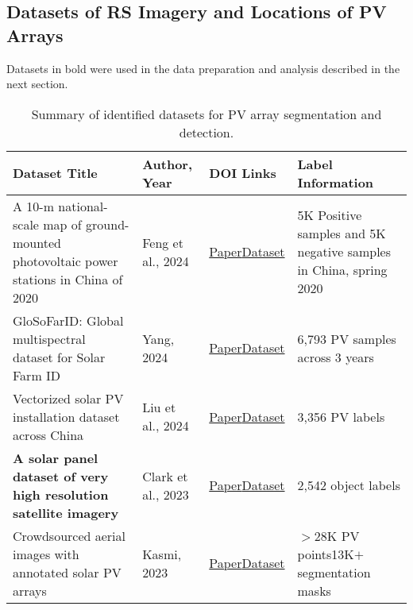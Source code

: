 \subsection{Datasets of RS Imagery and Locations of PV Arrays}
    Datasets in bold were used in the data preparation and analysis described in the next section. 
    \begin{table*}[htbp]
        \centering
        \scriptsize
        \caption{Summary of identified datasets for PV array segmentation and detection.}
        \begin{tabularx}{.95\textwidth}{|p{}|p{}|p{}|p{}|}  \hline
            \textbf{Dataset Title} & \textbf{Author, Year} & \textbf{DOI Links} & \textbf{Label Information} \\
                \hline
                A 10-m national-scale map of ground-mounted photovoltaic power stations in China of 2020 & Feng et al., 2024 & \href{https://doi.org/10.1038/s41597-024-02994-x}{Paper}\linebreak \href{https://doi.org/10.57760/sciencedb.o00121.00001}{Dataset} & 5K Positive samples and 5K negative samples in China, spring 2020 \\
                \hline
                GloSoFarID: Global multispectral dataset for Solar Farm ID & Yang, 2024 & \href{https://doi.org/10.48550/arXiv.2404.05180}{Paper}\linebreak \href{https://github.com/yzyly1992/GloSoFarID/tree/main/data_coordinates}{Dataset} & 6,793 PV samples across 3 years \\
                \hline
                Vectorized solar PV installation dataset across China & Liu et al., 2024 & \href{https://doi.org/10.1038/s41597-024-04356-z}{Paper}\linebreak \href{https://github.com/qingfengxitu/ChinaPV}{Dataset} & 3,356 PV labels \\
                \hline
                \textbf{A solar panel dataset of very high resolution satellite imagery} & Clark et al., 2023 & \href{https://doi.org/10.1038/s41597-023-02539-8}{Paper}\linebreak \href{https://doi.org/10.6084/m9.figshare.22081091.v3}{Dataset} & 2,542 object labels \\
                \hline
                Crowdsourced aerial images with annotated solar PV arrays & Kasmi, 2023 & \href{https://doi.org/10.1038/s41597-023-01951-4}{Paper}\linebreak \href{https://doi.org/10.5281/zenodo.6865878}{Dataset} & $>$28K PV points\linebreak 13K$+$ segmentation masks \\

\end{tabularx}
\end{table*}
